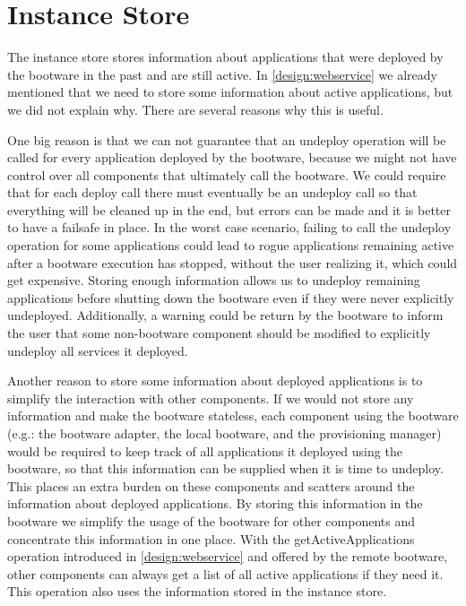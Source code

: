 \section{Instance Store}
\label{design:instancestore}

The instance store stores information about applications that were deployed by the bootware in the past and are still active.
In \autoref{design:webservice} we already mentioned that we need to store some information about active applications, but we did not explain why.
There are several reasons why this is useful.

One big reason is that we can not guarantee that an undeploy operation will be called for every application deployed by the bootware, because we might not have control over all components that ultimately call the bootware.
We could require that for each deploy call there must eventually be an undeploy call so that everything will be cleaned up in the end, but errors can be made and it is better to have a failsafe in place.
In the worst case scenario, failing to call the undeploy operation for some applications could lead to rogue applications remaining active after a bootware execution has stopped, without the user realizing it, which could get expensive.
Storing enough information allows us to undeploy remaining applications before shutting down the bootware even if they were never explicitly undeployed.
Additionally, a warning could be return by the bootware to inform the user that some non-bootware component should be modified to explicitly undeploy all services it deployed.

Another reason to store some information about deployed applications is to simplify the interaction with other components.
If we would not store any information and make the bootware stateless, each component using the bootware (e.g.: the bootware adapter, the local bootware, and the provisioning manager) would be required to keep track of all applications it deployed using the bootware, so that this information can be supplied when it is time to undeploy.
This places an extra burden on these components and scatters around the information about deployed applications.
By storing this information in the bootware we simplify the usage of the bootware for other components and concentrate this information in one place.
With the getActiveApplications operation introduced in \autoref{design:webservice} and offered by the remote bootware, other components can always get a list of all active applications if they need it.
This operation also uses the information stored in the instance store.

